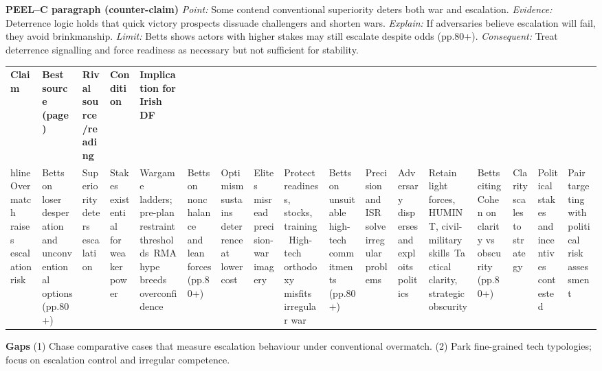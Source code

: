 \textbf{PEEL–C paragraph (counter-claim)}
\textit{Point:} Some contend conventional superiority deters both war and escalation.
\textit{Evidence:} Deterrence logic holds that quick victory prospects dissuade challengers and shorten wars.
\textit{Explain:} If adversaries believe escalation will fail, they avoid brinkmanship.
\textit{Limit:} Betts shows actors with higher stakes may still escalate despite odds (pp.80+).
\textit{Consequent:} Treat deterrence signalling and force readiness as necessary but not sufficient for stability.

\usepackage{array}
\begin{tabular}{p{3.2cm}p{4.2cm}p{3.6cm}p{3.2cm}p{4.2cm}}
	\textbf{Claim} & \textbf{Best source (page)} & \textbf{Rival source/reading} & \textbf{Condition} & \textbf{Implication for Irish DF}\\hline
	Overmatch raises escalation risk & Betts on loser desperation and unconventional options (pp.80+) & Superiority deters escalation & Stakes existential for weaker power & Wargame ladders; pre-plan restraint thresholds\
	RMA hype breeds overconfidence & Betts on nonchalance and lean forces (pp.80+) & Optimism sustains deterrence at lower cost & Elites misread precision-war imagery & Protect readiness, stocks, training\
	High-tech orthodoxy misfits irregular war & Betts on unsuitable high-tech commitments (pp.80+) & Precision and ISR solve irregular problems & Adversary disperses and exploits politics & Retain light forces, HUMINT, civil-military skills\
	Tactical clarity, strategic obscurity & Betts citing Cohen on clarity vs obscurity (pp.80+) & Clarity scales to strategy & Political stakes and incentives contested & Pair targeting with political risk assessment\
\end{tabular}

\textbf{Gaps}
(1) Chase comparative cases that measure escalation behaviour under conventional overmatch.
(2) Park fine-grained tech typologies; focus on escalation control and irregular competence.

\parencite{BLAINEY_2003}


